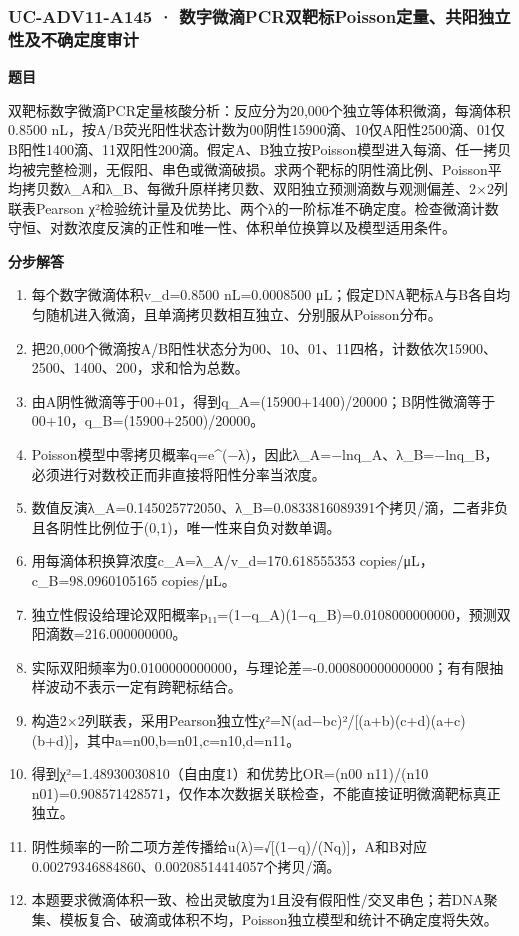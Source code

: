 \documentclass[UTF8,11pt,a4paper]{ctexart}
\begin{document}
\subsubsection*{UC-ADV11-A145 · 数字微滴PCR双靶标Poisson定量、共阳独立性及不确定度审计}
\noindent\textbf{题目}\par
双靶标数字微滴PCR定量核酸分析：反应分为20,000个独立等体积微滴，每滴体积0.8500 nL，按A/B荧光阳性状态计数为00阴性15900滴、10仅A阳性2500滴、01仅B阳性1400滴、11双阳性200滴。假定A、B独立按Poisson模型进入每滴、任一拷贝均被完整检测，无假阳、串色或微滴破损。求两个靶标的阴性滴比例、Poisson平均拷贝数λ\_A和λ\_B、每微升原样拷贝数、双阳独立预测滴数与观测偏差、2×2列联表Pearson χ²检验统计量及优势比、两个λ的一阶标准不确定度。检查微滴计数守恒、对数浓度反演的正性和唯一性、体积单位换算以及模型适用条件。\par
\medskip\noindent\textbf{分步解答}
\begin{enumerate}
\item 每个数字微滴体积v\_d=0.8500 nL=0.0008500 μL；假定DNA靶标A与B各自均匀随机进入微滴，且单滴拷贝数相互独立、分别服从Poisson分布。
\item 把20,000个微滴按A/B阳性状态分为00、10、01、11四格，计数依次15900、2500、1400、200，求和恰为总数。
\item 由A阴性微滴等于00+01，得到q\_A=(15900+1400)/20000；B阴性微滴等于00+10，q\_B=(15900+2500)/20000。
\item Poisson模型中零拷贝概率q=e\textasciicircum{}(−λ)，因此λ\_A=−lnq\_A、λ\_B=−lnq\_B，必须进行对数校正而非直接将阳性分率当浓度。
\item 数值反演λ\_A=0.145025772050、λ\_B=0.0833816089391个拷贝/滴，二者非负且各阴性比例位于(0,1)，唯一性来自负对数单调。
\item 用每滴体积换算浓度c\_A=λ\_A/v\_d=170.618555353 copies/μL，c\_B=98.0960105165 copies/μL。
\item 独立性假设给理论双阳概率p₁₁=(1−q\_A)(1−q\_B)=0.0108000000000，预测双阳滴数=216.000000000。
\item 实际双阳频率为0.0100000000000，与理论差=-0.000800000000000；有有限抽样波动不表示一定有跨靶标结合。
\item 构造2×2列联表，采用Pearson独立性χ²=N(ad−bc)²/[(a+b)(c+d)(a+c)(b+d)]，其中a=n00,b=n01,c=n10,d=n11。
\item 得到χ²=1.48930030810（自由度1）和优势比OR=(n00 n11)/(n10 n01)=0.908571428571，仅作本次数据关联检查，不能直接证明微滴靶标真正独立。
\item 阴性频率的一阶二项方差传播给u(λ)=√[(1−q)/(Nq)]，A和B对应0.00279346884860、0.00208514414057个拷贝/滴。
\item 本题要求微滴体积一致、检出灵敏度为1且没有假阳性/交叉串色；若DNA聚集、模板复合、破滴或体积不均，Poisson独立模型和统计不确定度将失效。
\end{enumerate}
\end{document}
